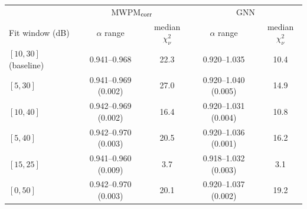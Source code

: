 \begin{tabular}{l|cc|cc}
\toprule
 & \multicolumn{2}{c|}{MWPM$_{\rm corr}$} & \multicolumn{2}{c}{GNN} \\
Fit window (dB) & $\alpha$ range & median $\chi^2_\nu$ & $\alpha$ range & median $\chi^2_\nu$ \\
\hline
\midrule
$[10, 30]$ (baseline) & 0.941--0.968 & 22.3 & 0.920--1.035 & 10.4 \\
$[5, 30]$ & 0.941--0.969 (0.002) & 27.0 & 0.920--1.040 (0.005) & 14.9 \\
$[10, 40]$ & 0.942--0.969 (0.002) & 16.4 & 0.920--1.031 (0.004) & 10.8 \\
$[5, 40]$ & 0.942--0.970 (0.003) & 20.5 & 0.920--1.036 (0.001) & 16.2 \\
$[15, 25]$ & 0.941--0.960 (0.009) & 3.7 & 0.918--1.032 (0.003) & 3.1 \\
$[0, 50]$ & 0.942--0.970 (0.003) & 20.1 & 0.920--1.037 (0.002) & 19.2 \\
\bottomrule
\end{tabular}
